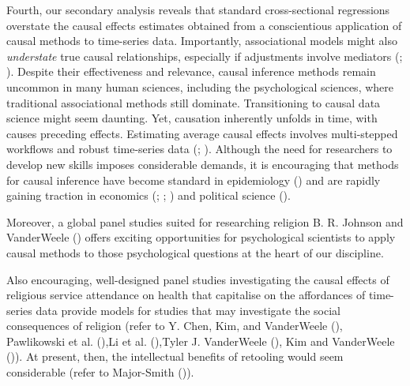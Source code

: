 \documentclass[
  single column]{article}
\begin{document}
Fourth, our secondary analysis reveals that standard cross-sectional
regressions overstate the causal effects estimates obtained from a
conscientious application of causal methods to time-series data.
Importantly, associational models might also \emph{understate} true
causal relationships, especially if adjustments involve mediators
(;
). Despite their
effectiveness and relevance, causal inference methods remain uncommon in
many human sciences, including the psychological sciences, where
traditional associational methods still dominate. Transitioning to
causal data science might seem daunting. Yet, causation inherently
unfolds in time, with causes preceding effects. Estimating average
causal effects involves multi-stepped workflows and robust time-series
data (;
). Although the need for
researchers to develop new skills imposes considerable demands, it is
encouraging that methods for causal inference have become standard in
epidemiology () and are rapidly
gaining traction in economics (; ; ) and political
science ().

Moreover, a global panel studies suited for researching religion B. R.
Johnson and VanderWeele () offers
exciting opportunities for psychological scientists to apply causal
methods to those psychological questions at the heart of our discipline.

Also encouraging, well-designed panel studies investigating the causal
effects of religious service attendance on health that capitalise on the
affordances of time-series data provide models for studies that may
investigate the social consequences of religion (refer to Y. Chen, Kim,
and VanderWeele (), Pawlikowski et
al. (),Li et al.
(),Tyler J. VanderWeele
(),
Kim and VanderWeele ()). At
present, then, the intellectual benefits of retooling would seem
considerable (refer to Major-Smith
()).
\end{document}
